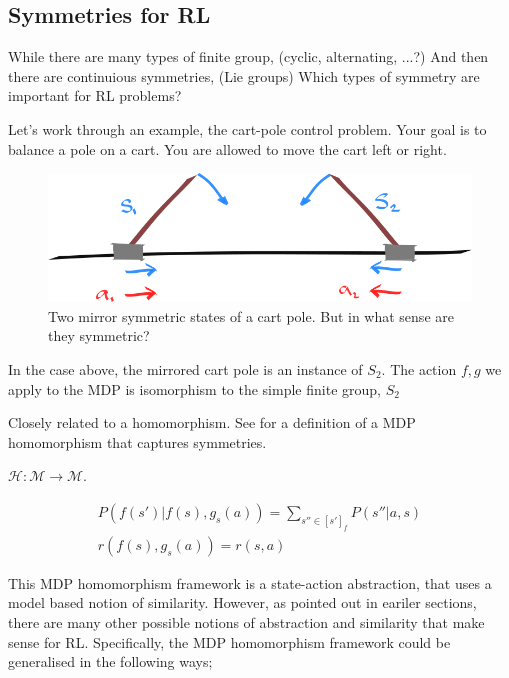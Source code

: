 \subsection{Symmetries for RL}\label{mdp-homomorphism}

While there are many types of finite group, (cyclic, alternating, ...?) And then there are continuious symmetries, (Lie groups)
Which types of symmetry are important for RL problems?

Let's work through an example, the cart-pole control problem. Your goal is to balance a pole on a cart.
You are allowed to move the cart left or right.


\begin{figure}[h!]
	\centering
	\includegraphics[width=1\textwidth,height=0.25\textheight]{../../pictures/drawings/cart-pole-mirror.png}
	\caption{Two mirror symmetric states of a cart pole. But in what sense are they symmetric?}
\end{figure}

In the case above, the mirrored cart pole is an instance of $S_2$.
The action $f, g$ we apply to the MDP is isomorphism to the simple finite group, $S_2$

Closely related to a homomorphism. See for a definition of a MDP homomorphism that captures symmetries.

\cite{Ravindran2002}

$\mathcal H: \mathcal M\to \mathcal M$.

\begin{align}
P(f(s')|f(s), g_s(a)) = \sum_{s''\in [s']_f} P(s''| a, s) \\
r(f(s), g_s(a)) = r(s, a)
\end{align}

This MDP homomorphism framework is a state-action abstraction, that uses a model based notion of similarity.
However, as pointed out in eariler sections, there are many other possible
notions of abstraction and similarity that make sense for RL. Specifically, the MDP homomorphism framework
could be generalised in the following ways;

